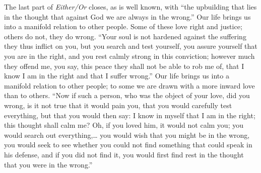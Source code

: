 \documentclass[12pt,a4paper,openany]{book}
\begin{document}
The last part of \emph{Either/Or} closes, as is well known, with ``the
upbuilding that lies in the thought that against God we are always in the
wrong.'' Our life brings us into a manifold relation to other people.
Some of these love right and justice; others do not, they do wrong. ``Your
soul is not hardened against the suffering they thus inflict on you, but
you search and test yourself, you assure yourself that you are in the
right, and you rest calmly strong in this conviction; however much they
offend me, you say, this peace they shall not be able to rob me of, that
I know I am in the right and that I suffer wrong.'' Our life brings us
into a manifold relation to other people; to some we are drawn with a
more inward love than to others. ``Now if such a person, who was the
object of your love, did you wrong, is it not true that it would pain
you, that you would carefully test everything, but that you would then
say: I know in myself that I am in the right; this thought shall calm me?
Oh, if you loved him, it would not calm you; you would search out
everything,\dots{} you would wish that you might be in the wrong, you would
seek to see whether you could not find something that could speak in his
defense, and if you did not find it, you would first find rest in the
thought that you were in the wrong.''
\end{document}
